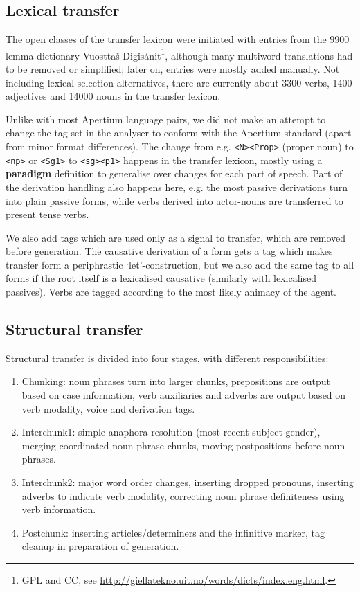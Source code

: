\subsection{Lexical transfer}
The open classes of the transfer lexicon were initiated with entries
from the 9900 lemma dictionary Vuosttaš Digis\'{a}nit\footnote{GPL and CC,
  see
  \href{http://giellatekno.uit.no/words/dicts/index.eng.html}{http://giellatekno.uit.no/words/dicts/index.eng.html}.},
although many multiword translations had to be removed or simplified;
later on, entries were mostly added manually. Not including lexical
selection alternatives, there are currently about 3300 verbs, 1400
adjectives and 14000 nouns in the transfer lexicon.

Unlike with most Apertium language pairs, we did not make an attempt
to change the tag set in the analyser to conform with the Apertium
standard (apart from minor format differences). The change from e.g.
\texttt{<N><Prop>} (proper noun) to \texttt{<np>} or \texttt{<Sg1>} to
\texttt{<sg><p1>} happens in the transfer lexicon, mostly using a
\textbf{paradigm} definition to generalise over changes for each part
of speech. Part of the derivation handling also happens here, e.g. the
most passive derivations turn into plain passive forms, while verbs
derived into actor-nouns are transferred to present tense verbs.

We also add tags which are used only as a signal to transfer, which
are removed before generation. The causative derivation of a form gets
a tag which makes transfer form a periphrastic `let'-construction, but
we also add the same tag to all forms if the root itself is a
lexicalised causative (similarly with lexicalised passives). Verbs are
tagged according to the most likely animacy of the agent.

\subsection{Structural transfer}
\label{sec:structural-transfer}
Structural transfer is divided into four stages, with different
responsibilities:

\begin{enumerate}

\item Chunking: noun phrases turn into larger chunks, prepositions are
  output based on case information, verb auxiliaries and adverbs are
  output based on verb modality, voice and derivation tags.

\item Interchunk1: simple anaphora resolution (most recent subject
  gender), merging coordinated noun phrase chunks, moving
  postpositions before noun phrases.

\item Interchunk2: major word order changes, inserting dropped
  pronouns, inserting adverbs to indicate verb modality, correcting
  noun phrase definiteness using verb information.

\item Postchunk: inserting articles/determiners and the infinitive
  marker, tag cleanup in preparation of generation.
\end{enumerate}


